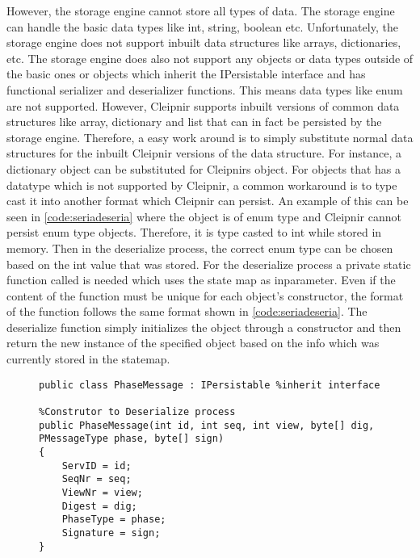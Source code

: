 However, the storage engine cannot store all types of data. The storage engine can handle the basic data types like int, string, boolean etc. Unfortunately, the storage engine does not support inbuilt data structures like arrays, dictionaries, etc. The storage engine does also not support any objects or data types outside of the basic ones or objects which inherit the IPersistable interface and has functional serializer and deserializer functions. This means data types like enum are not supported. However, Cleipnir supports inbuilt versions of common data structures like array, dictionary and list that can in fact be persisted by the storage engine. Therefore, a easy work around is to simply substitute normal data structures for the inbuilt Cleipnir versions of the data structure. For instance, a dictionary object can be substituted for Cleipnirs  object. For objects that has a datatype which is not supported by Cleipnir, a common workaround is to type cast it into another format which Cleipnir can persist. An example of this can be seen in \autoref{code:seriadeseria} where the object  is of enum type and Cleipnir cannot persist enum type objects. Therefore, it is type casted to int while stored in memory. Then in the deserialize process, the correct enum type can be chosen based on the int value that was stored. For the deserialize process a private static function called  is needed which uses the state map as inparameter. Even if the content of the function must be unique for each object’s constructor, the format of the function follows the same format shown in \autoref{code:seriadeseria}. The deserialize function simply initializes the object through a constructor and then return the new instance of the specified object based on the info which was currently stored in the statemap.

\begin{figure}[H]
	\centering
	\lstset{style=sharpc}
	\begin{lstlisting}[label = code:interfaceexample, caption=Persistent initialize process, captionpos=b, basicstyle=\scriptsize]
public class PhaseMessage : IPersistable %inherit interface
		
%Construtor to Deserialize process
public PhaseMessage(int id, int seq, int view, byte[] dig, PMessageType phase, byte[] sign)
{
    ServID = id;
    SeqNr = seq;
    ViewNr = view;
    Digest = dig;
    PhaseType = phase;
    Signature = sign;
}
	\end{lstlisting}
\end{figure}

